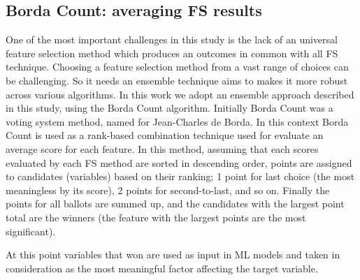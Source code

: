 \subsection{Borda Count: averaging FS results}
One of the most important challenges in this study is the lack of an universal feature selection method which produces an outcomes in common with all FS technique. Choosing a feature selection method from a vast range of choices can be challenging. \newline
So it needs an ensemble technique aims to makes it more robust across various algorithms. In this work we adopt an ensemble approach described in this study\cite{sarkar2014robust}, using the Borda Count algorithm. Initially Borda Count was a voting system method, named for Jean-Charles de Borda\cite{borda1784memoire}.\newline
In this context Borda Count is used as a rank-based combination technique used for evaluate an average score for each feature. In this method, assuming that each scores evaluated by each FS method are sorted in descending order, points are assigned to candidates (variables) based on their ranking; 1 point for last choice (the most meaningless by its score), 2 points for second-to-last, and so on. Finally the points for all ballots are summed up, and the candidates with the largest point total are the winners (the feature with the largest points are the most significant).
\par
At this point variables that won are used as input in ML models and taken in consideration as the most meaningful factor affecting the target variable.
\bigbreak\bigbreak\bigbreak

